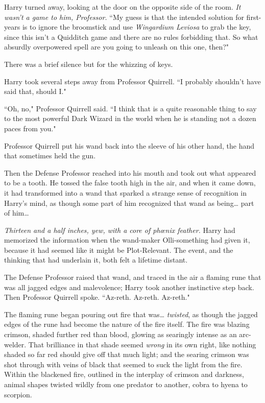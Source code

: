 Harry turned away, looking at the door on the opposite side of the room. \emph{It wasn't a game to him, Professor.} ``My guess is that the intended solution for first-years is to ignore the broomstick and use \emph{Wingardium Leviosa} to grab the key, since this isn't a Quidditch game and there are no rules forbidding that. So what absurdly overpowered spell are you going to unleash on this one, then?"

There was a brief silence but for the whizzing of keys.

Harry took several steps away from Professor Quirrell. ``I probably shouldn't have said that, should I."

``Oh, no," Professor Quirrell said. ``I think that is a quite reasonable thing to say to the most powerful Dark Wizard in the world when he is standing not a dozen paces from you."

Professor Quirrell put his wand back into the sleeve of his other hand, the hand that sometimes held the gun.

Then the Defense Professor reached into his mouth and took out what appeared to be a tooth. He tossed the false tooth high in the air, and when it came down, it had transformed into a wand that sparked a strange sense of recognition in Harry's mind, as though some part of him recognized that wand as being{\ldots} part of him{\ldots}

\emph{Thirteen and a half inches, yew, with a core of phœnix feather.} Harry had memorized the information when the wand-maker Olli-something had given it, because it had seemed like it might be Plot-Relevant. The event, and the thinking that had underlain it, both felt a lifetime distant.

The Defense Professor raised that wand, and traced in the air a flaming rune that was all jagged edges and malevolence; Harry took another instinctive step back. Then Professor Quirrell spoke. ``Az-reth. Az-reth. Az-reth."

The flaming rune began pouring out fire that was{\ldots} \emph{twisted}, as though the jagged edges of the rune had become the nature of the fire itself. The fire was blazing crimson, shaded further red than blood, glowing as searingly intense as an arc-welder. That brilliance in that shade seemed \emph{wrong} in its own right, like nothing shaded so far red should give off that much light; and the searing crimson was shot through with veins of black that seemed to suck the light from the fire. Within the blackened fire, outlined in the interplay of crimson and darkness, animal shapes twisted wildly from one predator to another, cobra to hyena to scorpion.

